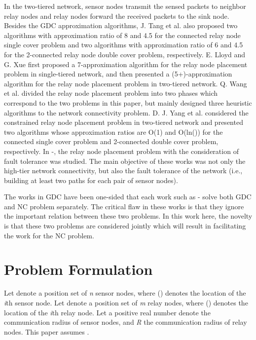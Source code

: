 \documentclass[journal]{IEEEtran}
\begin{document}
In the two-tiered network, sensor nodes transmit the sensed packets to neighbor relay nodes and relay nodes forward the received packets to the sink node. Besides the GDC approximation algorithms, J. Tang et al. \cite{Tang06} also proposed two algorithms with approximation ratio of 8 and 4.5 for the connected relay node single cover problem and two algorithms with approximation ratio of 6 and 4.5 for the 2-connected relay node double cover problem, respectively.
E. Lloyd and G. Xue \cite{Lloyd07} first proposed a 7-approximation algorithm for the relay node placement problem in single-tiered network, and then presented a (5+)-approximation algorithm for the relay node placement problem in two-tiered network. Q. Wang et al. \cite{Wang07} divided the relay node placement problem into two phases which correspond to the two problems in this paper, but mainly designed three heuristic algorithms to the network connectivity problem. D. J. Yang et al. \cite{Yang12} considered the constrained relay node placement problem in two-tiered network and presented two algorithms whose approximation ratios are O(1) and O(ln()) for the connected single cover problem and 2-connected double cover problem, respectively. In \cite{Sandor08}-\cite{Dandekar12}, the relay node placement problem with the consideration of fault tolerance was studied. The main objective of these works was not only the high-tier network connectivity, but also the fault tolerance of the network (i.e., building at least two paths for each pair of sensor nodes).

The works in GDC have been one-sided that each work such as \cite{Tang06} \cite{Lin99}-\cite{Dandekar12} solve both GDC and NC problem separately. The critical flaw in these works is that they ignore the important relation between these two problems. In this work here, the novelty is that these two problems are considered jointly which will result in facilitating the work for the NC problem.

\section{Problem Formulation}
Let   denote a position set of \emph{n} sensor nodes, where  () denotes the location of the \emph{i}th sensor node. Let  denote a position set of \emph{m} relay nodes, where  () denotes the location of the \emph{i}th relay node. Let a positive real number  denote the communication radius of sensor nodes, and \emph{R} the communication radius of relay nodes. This paper assumes .
\end{document}
